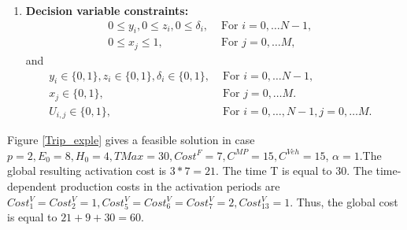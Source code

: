 \documentclass[11pt]{article}
\theoremstyle{plain}%
\theoremstyle{definition} \newtheorem{lem}{Lemma}[section]
\theoremstyle{definition} \newtheorem{claim}{Claim}[lem]
\theoremstyle{definition} \newtheorem{theorem}{Theorem}[section]
\theoremstyle{definition} \newtheorem{exo}{Exercice n$^\circ$}
\theoremstyle{definition} \newtheorem{quest}{}[exo]
\theoremstyle{definition} \newtheorem{sousquest}{}[quest]
\theoremstyle{remark}
\theoremstyle{definition}
\begin{document}
\begin{enumerate}
\item {\bf Decision variable constraints:}
\begin{eqnarray}	
0 \le y_i, 0 \le z_i, 0 \le \delta_i,  & \textrm{ For  } i=0, \ldots N-1,&\label{Dec01} \\
0 \le x_j \le 1,  & \textrm{ For }  j = 0, \ldots M ,&\label{Dec02}
\end{eqnarray}
and 
\begin{eqnarray}	
y_i \in \{0,1 \} ,  z_i \in \{0,1 \},  \delta_i \in \{0,1 \},  & \textrm{ For  } i=0, \ldots N-1,&\label{Dec03} \\
 x_j \in \{0,1 \} ,  & \textrm{ For }  j = 0, \ldots M .&\label{Dec04} \\
U_{i,j}\in \{0,1 \} ,& \textrm{ For }  i= 0, \ldots, N-1, j = 0, \ldots M .& \label{Dec05}  
\end{eqnarray}

\end{enumerate}
Figure \ref{Trip_exple} gives a feasible solution in case $p = 2, E_0 = 8, H_0 = 4, TMax = 30, Cost^F = 7, C^{MP} = 15, C^{Veh} = 15$, $\alpha= 1$.The global resulting activation cost is $3*7 = 21$. The time T is equal to $30$. The time-dependent production costs in the activation periods are $Cost_1^V=Cost_2^V=1, Cost_5^V=Cost_6^V=Cost_7^V=2, Cost_{13}^V=1$. Thus, the global cost is equal to $21 + 9 + 30 = 60$.
\end{document}
